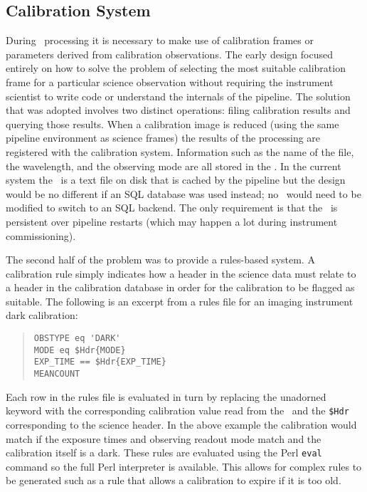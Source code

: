 \documentclass[final,authoryear,5p,times,twocolumn]{elsarticle}
\begin{document}
\subsection{Calibration System}

During \Frame\ processing it is necessary to make use of calibration
frames or parameters derived from calibration observations. The early
design focused entirely on how to solve the problem of selecting the
most suitable calibration frame for a particular science observation
without requiring the instrument scientist to write code or understand
the internals of the pipeline. The solution that was adopted involves
two distinct operations: filing calibration results and querying those results.
When a calibration image is reduced (using the same pipeline
environment as science frames) the results of the processing are
registered with the calibration system. Information such as the name
of the file, the wavelength, and the observing mode are all stored in the \Index.
In the current system the \Index\ is a text file on disk that is cached by
the pipeline but the design would be no different if an SQL database
was used instead; no \primitives\ would need to be modified to switch
to an SQL backend.  The only requirement is that the \Index\ is
persistent over pipeline restarts (which may happen a lot during
instrument commissioning).

The second half of the problem was to provide a rules-based system.
A calibration rule simply indicates how a header in the science data
must relate to a header in the calibration database in order for the
calibration to be flagged as suitable. The following is an excerpt
from a rules file for an imaging instrument dark calibration:

\begin{quote}
{\small
\begin{verbatim}
OBSTYPE eq 'DARK'
MODE eq $Hdr{MODE}
EXP_TIME == $Hdr{EXP_TIME}
MEANCOUNT
\end{verbatim}
}
\end{quote}

Each row in the rules file is evaluated in turn by replacing the
unadorned keyword with the corresponding calibration value read from
the \Index\ and the \texttt{\$Hdr} corresponding to the science
header. In the above example the
calibration would match if the exposure times and observing readout
mode match and the calibration itself is a dark.
These rules are evaluated using the Perl \texttt{eval} command
so the full Perl interpreter is available. This allows for
complex rules to be generated such as a rule that allows a calibration to expire
if it is too old.
\end{document}

